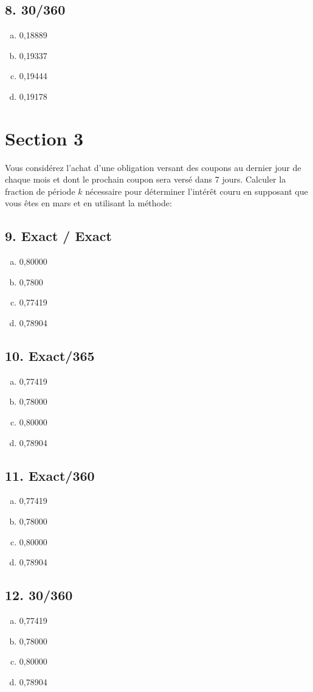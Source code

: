 \documentclass[10pt,a4paper]{article}
\begin{document}
\subsection*{8. 30/360}
\begin{enumerate}[a)]
\item 0,18889
\item 0,19337
\item 0,19444
\item 0,19178
\end{enumerate}

\newpage 

\section*{Section 3}
Vous considérez l’achat d’une obligation versant des coupons au dernier jour de chaque mois et dont le prochain coupon sera versé dans 7 jours. Calculer la fraction de période $k$ nécessaire pour déterminer l’intérêt couru en supposant que vous êtes en mars et en utilisant la méthode: 

\subsection*{9.  Exact / Exact} 
\begin{enumerate}[a)]
\item 0,80000 
\item 0,7800
\item 0,77419 
\item 0,78904 
\end{enumerate}

\subsection*{10.  Exact/365} 
\begin{enumerate}[a)]
\item 0,77419  
\item 0,78000
\item 0,80000 
\item 0,78904
\end{enumerate}

\subsection*{11. Exact/360}
\begin{enumerate}[a)]
\item 0,77419  
\item 0,78000 
\item 0,80000 
\item 0,78904
\end{enumerate}

\subsection*{12.  30/360}
\begin{enumerate}[a)]
\item 0,77419  
\item 0,78000 
\item 0,80000 
\item 0,78904
\end{enumerate}
\end{document}
